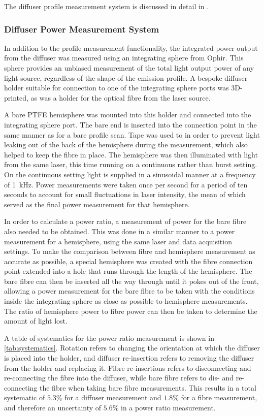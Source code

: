 \documentclass[a4paper,11pt]{article}
\begin{document}
The diffuser profile measurement system is discussed in detail in \cite{TN42}.

\subsubsection{Diffuser Power Measurement System}

In addition to the profile measurement functionality, the integrated power output from the diffuser was measured using an integrating sphere from Ophir. This sphere provides an unbiased measurement of the total light output power of any light source, regardless of the shape of the emission profile. A bespoke diffuser holder suitable for connection to one of the integrating sphere ports was 3D-printed, as was a holder for the optical fibre from the laser source. 

A bare PTFE hemisphere was mounted into this holder and connected into the integrating sphere port. The bare end is inserted into the connection point in the same manner as for a bare profile scan. Tape was used to in order to prevent light leaking out of the back of the hemisphere during the measurement, which also helped to keep the fibre in place. The hemisphere was then illuminated with light from the same laser, this time running on a continuous rather than burst setting. On the continuous setting light is supplied in a sinusoidal manner at a frequency of 1~kHz. Power measurements were taken once per second for a period of ten seconds to account for small fluctuations in laser intensity, the mean of which served as the final power measurement for that hemisphere. 

In order to calculate a power ratio, a measurement of power for the bare fibre also needed to be obtained. This was done in a similar manner to a power measurement for a hemisphere, using the same laser and data acquisition settings. To make the comparison between fibre and hemisphere measurement as accurate as possible, a special hemisphere was created with the fibre connection point extended into a hole that runs through the length of the hemisphere. The bare fibre can then be inserted all the way through until it pokes out of the front, allowing a power measurement for the bare fibre to be taken with the conditions inside the integrating sphere as close as possible to hemisphere measurements. The ratio of hemisphere power to fibre power can then be taken to determine the amount of light lost.


A table of systematics for the power ratio measurement is shown in \cref{tab:systematics}. Rotation refers to changing the orientation at which the diffuser is placed into the holder, and diffuser re-insertion refers to removing the diffuser from the holder and replacing it. Fibre re-insertions refers to disconnecting and re-connecting the fibre into the diffuser, while bare fibre refers to dis- and re-connecting the fibre when taking bare fibre measurements. This results in a total systematic of $5.3\%$ for a diffuser measurement and $1.8\%$ for a fibre measurement, and therefore an uncertainty of $5.6\%$ in a power ratio measurement.
\end{document}
